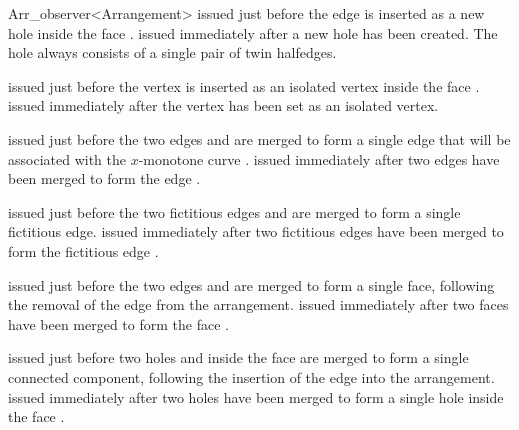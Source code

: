 \begin{ccRefClass}{Arr_observer<Arrangement>}
    {issued just before the edge  is inserted as a new hole inside
     the face .}
\ccGlue
{}
    {issued immediately after a new hole  has been created. The hole
     always consists of a single pair of twin halfedges.}

    {issued just before the vertex  is inserted as an isolated
     vertex inside the face .}
\ccGlue
{}
    {issued immediately after the vertex  has been set as an
     isolated vertex.}

    {issued just before the two edges  and  are merged to
     form a single edge that will be associated with the $x$-monotone curve
     .}
\ccGlue
{}
    {issued immediately after two edges have been merged to form the edge
     .}

    {issued just before the two fictitious edges  and  are
     merged to form a single fictitious edge.}
\ccGlue
{}
    {issued immediately after two fictitious edges have been merged to form
     the fictitious edge .}

    {issued just before the two edges  and  are merged to
     form a single face, following the removal of the edge  from the
     arrangement.}
\ccGlue
{}
    {issued immediately after two faces have been merged to form the face
     .}

    {issued just before two holes  and  inside the face 
      are merged to form a single connected component, following the
     insertion of the edge  into the arrangement.}
\ccGlue
{}
    {issued immediately after two holes have been merged to form a single hole
      inside the face .}


\end{ccRefClass}
